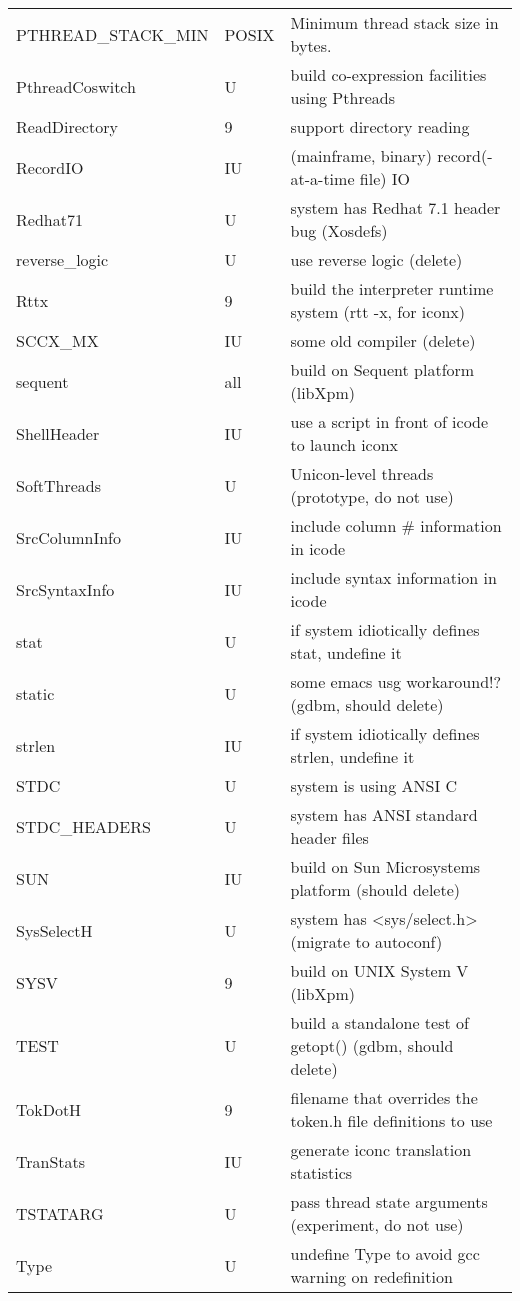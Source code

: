 \begin{xtabular}{|m{1.8in}|m{0.5in}|m{4.0in}|}
PTHREAD\_STACK\_MIN & POSIX & Minimum thread stack size in bytes. \\
PthreadCoswitch & U & build co-expression facilities using Pthreads \\
ReadDirectory & 9 & support directory reading \\
RecordIO & IU & (mainframe, binary) record(-at-a-time file) IO \\
Redhat71 & U & system has Redhat 7.1 header bug (Xosdefs) \\
reverse\_logic & U & use reverse logic (delete) \\
Rttx & 9 & build the interpreter runtime system (rtt -x, for iconx) \\
SCCX\_MX & IU & some old compiler (delete) \\
sequent & all & build on Sequent platform (libXpm) \\
ShellHeader & IU & use a script in front of icode to launch iconx \\
SoftThreads & U & Unicon-level threads (prototype, do not use) \\
SrcColumnInfo & IU & include column \# information in icode \\
SrcSyntaxInfo & IU & include syntax information in icode \\
stat & U & if system idiotically defines stat, undefine it \\
static & U & some emacs usg workaround!? (gdbm, should delete) \\
strlen & IU & if system idiotically defines strlen, undefine it \\
STDC & U & system is using ANSI C \\
STDC\_HEADERS & U & system has ANSI standard header files \\
SUN & IU & build on Sun Microsystems platform (should delete) \\
SysSelectH & U & system has <sys/select.h> (migrate to autoconf) \\
SYSV & 9 & build on UNIX System V (libXpm) \\
TEST & U & build a standalone test of getopt() (gdbm, should delete) \\
TokDotH & 9 & filename that overrides the token.h file definitions to use \\
TranStats & IU & generate iconc translation statistics \\
TSTATARG & U & pass thread state arguments (experiment, do not use) \\
Type & U & undefine Type to avoid gcc warning on redefinition \\

\end{xtabular}
